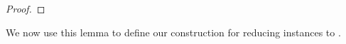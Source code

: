 \begin{proof}
%
%
%
%
%
%
%
%
\end{proof}

We now use this lemma to define our construction for reducing \ov{} instances to \lcs{}.

